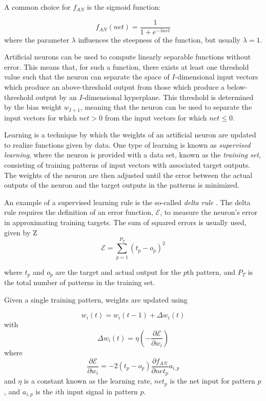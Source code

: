 \documentclass[master]{outhesis}
\begin{document}
A common choice for $f_{AN}$ is the sigmoid function:

\begin{displaymath}
f_{AN}(net) = \frac{1}{1 + e^{-\lambda net}}
\end{displaymath}
where the parameter $\lambda$ influences the steepness of the function, but usually $\lambda = 1$.

Artificial neurons can be used to compute linearly separable functions without error. This means that, for such a function, there exists at least one threshold value such that the neuron can separate the space of $I$-dimensional input vectors which produce an above-threshold output from those which produce a below-threshold output by an $I$-dimensional hyperplane. This threshold is determined by the bias weight $w_{I+1}$, meaning that the neuron can be used to separate the input vectors for which $net > 0$ from the input vectors for which $net \le 0$.

Learning is a technique by which the weights of an artificial neuron are updated to realize functions given by data.
One type of learning is known as \emph{supervised learning}, where the neuron is provided with a data set, known as the \emph{training set}, consisting of training patterns of input vectors with associated target outputs.
The weights of the neuron are then adjusted until the error between the actual outputs of the neuron and the target outputs in the patterns is minimized.

An example of a supervised learning rule is the so-called \emph{delta rule} \citep{Widrow:1960aa}.
The delta rule requires the definition of an error function, $\mathcal{E}$, to measure the neuron's error in approximating training targets.
The sum of squared errors is usually used, given by
Z
\begin{displaymath}
\mathcal{E} = \sum_{p=1}^{P_T}(t_p-o_p)^2
\end{displaymath}

where $t_p$ and $o_p$ are the target and actual output for the $p$th pattern, and $P_T$ is the total number of patterns in the training set.

Given a single training pattern, weights are updated using

\begin{displaymath}
w_i(t) = w_i(t - 1) + \Delta w_i(t)
\end{displaymath}
with
\begin{displaymath}
\Delta w_i(t) = \eta(- \frac{\partial \mathcal{E}}{\partial w_i})
\end{displaymath}
where
\begin{displaymath}
\frac{\partial \mathcal{E}}{\partial w_i} = -2(t_p - o_p)\frac{\partial f_{AN}}{\partial net_p}a_{i,p}
\end{displaymath}
and $\eta$ is a constant known as the learning rate, $net_p$ is the net input for pattern $p$, and $a_{i,p}$ is the $i$th input signal in pattern $p$.
\end{document}
